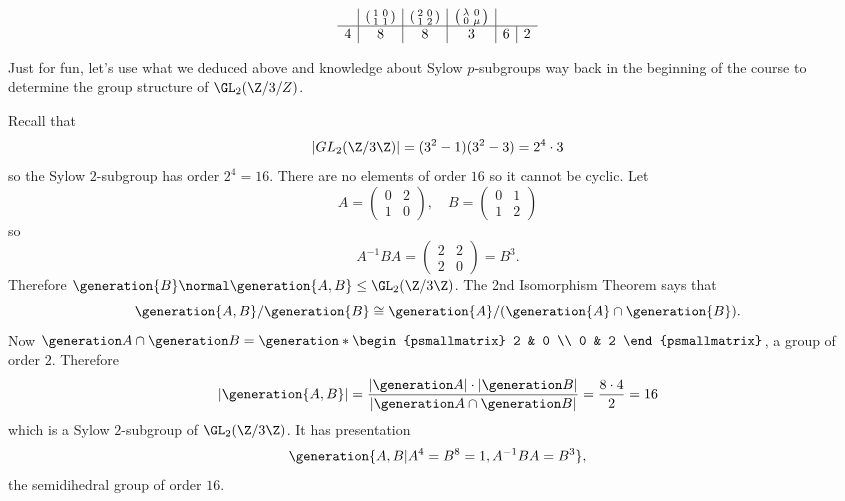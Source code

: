\documentclass[a4paper]{article}
\theoremstyle{definition}
\begin{document}
\begin{eg}
\[\begin{array}[h]{c|c|c|c|c|c}
          &
            \begin{psmallmatrix}
              1 & 0 \\
              1 & 1
            \end{psmallmatrix}
          &
            \begin{psmallmatrix}
              2 & 0 \\
              1 & 2
            \end{psmallmatrix}
          &
            \begin{psmallmatrix}
              \lambda & 0 \\
              0 & \mu
            \end{psmallmatrix}
      \\ \hline
      4 & 8 & 8 & 3 & 6 & 2
    \end{array}
  \]
\end{eg}

Just for fun, let's use what we deduced above and knowledge about Sylow \(p\)-subgroups way back in the beginning of the course to determine the group structure of \(\GL_2(\Z/3/Z)\).

Recall that
\[
  |GL_2(\Z/3\Z)| = (3^2 - 1)(3^2 - 3) = 2^4 \cdot 3
\]
so the Sylow \(2\)-subgroup has order \(2^4 = 16\). There are no elements of order \(16\) so it cannot be cyclic. Let
\[
  A =
  \begin{pmatrix}
    0 & 2 \\
    1 & 0
  \end{pmatrix}
  ,\quad
  B =
  \begin{pmatrix}
    0 & 1 \\
    1 & 2
  \end{pmatrix}
\]
so
\[
  A^{-1}BA =
  \begin{pmatrix}
    2 & 2 \\
    2 & 0
  \end{pmatrix}
  = B^3.
\]
Therefore \(\generation{B} \normal \generation{A, B} \leq \GL_2(\Z/3\Z)\). The 2nd Isomorphism Theorem says that
\[
  \generation{A, B}/\generation{B} \cong \generation{A}/(\generation{A} \cap \generation{B}).
\]
Now \(\generation A \cap \generation B = \generation*{\begin{psmallmatrix} 2 & 0 \\ 0 & 2 \end{psmallmatrix}}\), a group of order \(2\). Therefore
\[
  |\generation{A, B}| = \frac{|\generation A| \cdot |\generation B|}{|\generation A \cap \generation B|} = \frac{8 \cdot 4}{2} = 16
\]
which is a Sylow \(2\)-subgroup of \(\GL_2(\Z/3\Z)\). It has presentation
\[
  \generation{A, B| A^4 = B^8 = 1, A^{-1}BA = B^3},
\]
the semidihedral group of order \(16\).
\end{document}

